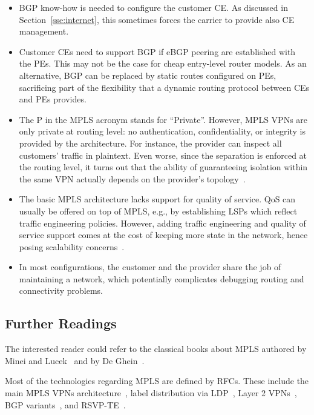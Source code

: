 \documentclass{article}
\begin{document}
\begin{itemize}

 \item BGP know-how is needed to configure the customer CE. As discussed in Section~\ref{sse:internet}, this sometimes forces the carrier to provide also CE management. 

 \item Customer CEs need to support BGP if eBGP peering are established with the PEs. This may not be the case for cheap entry-level router models. As an alternative, BGP can be replaced by static routes configured on PEs, sacrificing part of the flexibility that a dynamic routing protocol between CEs and PEs provides.

 \item The P in the MPLS acronym stands for ``Private''. However, MPLS VPNs are only private at routing level: no authentication, confidentiality, or integrity is provided by the architecture. For instance, the provider can inspect all customers' traffic in plaintext. Even worse, since the separation is enforced at the routing level, it turns out that the ability of guaranteeing isolation within the same VPN actually depends on the provider's topology~\cite{integrity}.

 \item The basic MPLS architecture lacks support for quality of service. QoS can usually be offered on top of MPLS, e.g., by establishing LSPs which reflect traffic engineering policies. However, adding traffic engineering and quality of service support comes at the cost of keeping more state in the network, hence posing scalability concerns~\cite{juniper-preso,rfc5439}.

 \item In most configurations, the customer and the provider share the job of maintaining a network, which potentially complicates debugging routing and connectivity problems.

\end{itemize}


\subsection{Further Readings}\label{sec:further-readings}

The interested reader could refer to the classical books about MPLS authored by Minei and Lucek~\cite{minei-lucek} and by De Ghein~\cite{de-ghein}.

Most of the technologies regarding MPLS are defined by RFCs. These include the main MPLS VPNs architecture~\cite{rfc3031,rfc4110}, label distribution via LDP~\cite{rfc5036}, Layer 2 VPNs~\cite{rfc4664}, BGP variants~\cite{rfc2858,rfc4364,rfc5512}, and RSVP-TE~\cite{rfc3209}.
\end{document}
